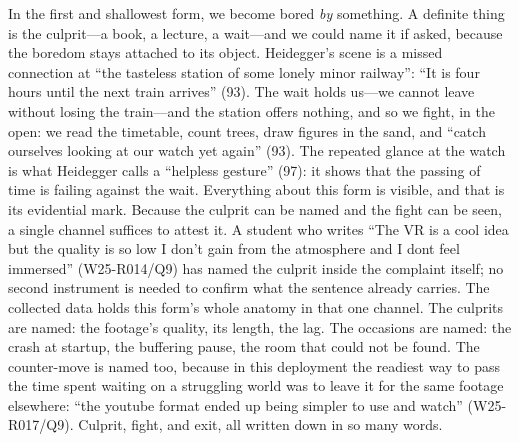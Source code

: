 In the first and shallowest form, we become bored \textit{by}
something. A definite thing is the culprit---a book, a lecture, a
wait---and we could name it if asked, because the boredom stays
attached to its object. Heidegger's scene is a missed connection at
``the tasteless station of some lonely minor railway'': ``It is four
hours until the next train arrives'' (93). The wait holds us---we
cannot leave without losing the train---and the station offers
nothing, and so we fight, in the open: we read the timetable, count
trees, draw figures in the sand, and ``catch ourselves looking at our
watch yet again'' (93). The repeated glance at the watch is what
Heidegger calls a ``helpless gesture'' (97): it shows that the passing
of time is failing against the wait. Everything about this form is
visible, and that is its evidential mark. Because the culprit can be
named and the fight can be seen, a single channel suffices to attest
it. A student who writes ``The VR is a cool idea but the quality is so
low I don't gain from the atmosphere and I dont feel immersed''
(W25-R014/Q9) has named the culprit inside the complaint itself; no
second instrument is needed to confirm what the sentence already
carries. The collected data holds this form's whole anatomy in
that one channel. The culprits are named: the footage's quality, its
length, the lag. The occasions are named: the crash at startup, the
buffering pause, the room that could not be found. The counter-move is
named too, because in this deployment the readiest way
to pass the time spent waiting on a struggling world was to leave it
for the same footage elsewhere: ``the youtube format ended up being
simpler to use and watch'' (W25-R017/Q9). Culprit, fight, and exit,
all written down in so many words.

